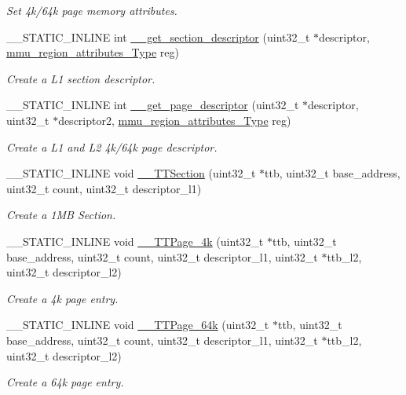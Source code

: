 \begin{DoxyCompactItemize}
\begin{DoxyCompactList}\small\item\em Set 4k/64k page memory attributes. \end{DoxyCompactList}\item 
\+\_\+\+\_\+\+S\+T\+A\+T\+I\+C\+\_\+\+I\+N\+L\+I\+NE int \hyperlink{group___m_m_u___functions_gaba0a8d570464881118b1594d32237547}{\+\_\+\+\_\+get\+\_\+section\+\_\+descriptor} (uint32\+\_\+t $\ast$descriptor, \hyperlink{struct_region_struct}{mmu\+\_\+region\+\_\+attributes\+\_\+\+Type} reg)
\begin{DoxyCompactList}\small\item\em Create a L1 section descriptor. \end{DoxyCompactList}\item 
\+\_\+\+\_\+\+S\+T\+A\+T\+I\+C\+\_\+\+I\+N\+L\+I\+NE int \hyperlink{group___m_m_u___functions_ga8ebe9d61b0b1e139068fd24e61f042b0}{\+\_\+\+\_\+get\+\_\+page\+\_\+descriptor} (uint32\+\_\+t $\ast$descriptor, uint32\+\_\+t $\ast$descriptor2, \hyperlink{struct_region_struct}{mmu\+\_\+region\+\_\+attributes\+\_\+\+Type} reg)
\begin{DoxyCompactList}\small\item\em Create a L1 and L2 4k/64k page descriptor. \end{DoxyCompactList}\item 
\+\_\+\+\_\+\+S\+T\+A\+T\+I\+C\+\_\+\+I\+N\+L\+I\+NE void \hyperlink{group___m_m_u___functions_gafb0322c3afe9d9b67411eb1e5d093d2e}{\+\_\+\+\_\+\+T\+T\+Section} (uint32\+\_\+t $\ast$ttb, uint32\+\_\+t base\+\_\+address, uint32\+\_\+t count, uint32\+\_\+t descriptor\+\_\+l1)
\begin{DoxyCompactList}\small\item\em Create a 1\+MB Section. \end{DoxyCompactList}\item 
\+\_\+\+\_\+\+S\+T\+A\+T\+I\+C\+\_\+\+I\+N\+L\+I\+NE void \hyperlink{group___m_m_u___functions_gab749bcf38edf77ab4112682e0e34834c}{\+\_\+\+\_\+\+T\+T\+Page\+\_\+4k} (uint32\+\_\+t $\ast$ttb, uint32\+\_\+t base\+\_\+address, uint32\+\_\+t count, uint32\+\_\+t descriptor\+\_\+l1, uint32\+\_\+t $\ast$ttb\+\_\+l2, uint32\+\_\+t descriptor\+\_\+l2)
\begin{DoxyCompactList}\small\item\em Create a 4k page entry. \end{DoxyCompactList}\item 
\+\_\+\+\_\+\+S\+T\+A\+T\+I\+C\+\_\+\+I\+N\+L\+I\+NE void \hyperlink{group___m_m_u___functions_gacf942453d586ba20dd49c7d7d2e073a3}{\+\_\+\+\_\+\+T\+T\+Page\+\_\+64k} (uint32\+\_\+t $\ast$ttb, uint32\+\_\+t base\+\_\+address, uint32\+\_\+t count, uint32\+\_\+t descriptor\+\_\+l1, uint32\+\_\+t $\ast$ttb\+\_\+l2, uint32\+\_\+t descriptor\+\_\+l2)
\begin{DoxyCompactList}\small\item\em Create a 64k page entry. \end{DoxyCompactList}\end{DoxyCompactItemize}


